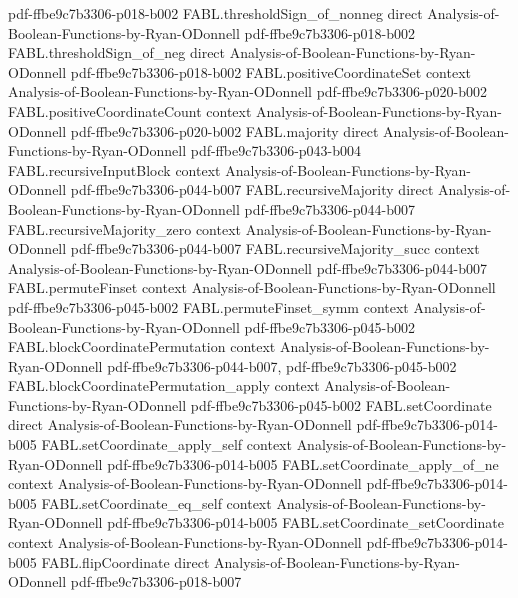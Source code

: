 \begin{theorem}
  {pdf-ffbe9c7b3306-p018-b002}
\proofstep
  {FABL.thresholdSign_of_nonneg}
  {direct}
  {Analysis-of-Boolean-Functions-by-Ryan-ODonnell}
  {pdf-ffbe9c7b3306-p018-b002}
\proofstep
  {FABL.thresholdSign_of_neg}
  {direct}
  {Analysis-of-Boolean-Functions-by-Ryan-ODonnell}
  {pdf-ffbe9c7b3306-p018-b002}
\proofstep
  {FABL.positiveCoordinateSet}
  {context}
  {Analysis-of-Boolean-Functions-by-Ryan-ODonnell}
  {pdf-ffbe9c7b3306-p020-b002}
\proofstep
  {FABL.positiveCoordinateCount}
  {context}
  {Analysis-of-Boolean-Functions-by-Ryan-ODonnell}
  {pdf-ffbe9c7b3306-p020-b002}
\proofstep
  {FABL.majority}
  {direct}
  {Analysis-of-Boolean-Functions-by-Ryan-ODonnell}
  {pdf-ffbe9c7b3306-p043-b004}
\proofstep
  {FABL.recursiveInputBlock}
  {context}
  {Analysis-of-Boolean-Functions-by-Ryan-ODonnell}
  {pdf-ffbe9c7b3306-p044-b007}
\proofstep
  {FABL.recursiveMajority}
  {direct}
  {Analysis-of-Boolean-Functions-by-Ryan-ODonnell}
  {pdf-ffbe9c7b3306-p044-b007}
\proofstep
  {FABL.recursiveMajority_zero}
  {context}
  {Analysis-of-Boolean-Functions-by-Ryan-ODonnell}
  {pdf-ffbe9c7b3306-p044-b007}
\proofstep
  {FABL.recursiveMajority_succ}
  {context}
  {Analysis-of-Boolean-Functions-by-Ryan-ODonnell}
  {pdf-ffbe9c7b3306-p044-b007}
\proofstep
  {FABL.permuteFinset}
  {context}
  {Analysis-of-Boolean-Functions-by-Ryan-ODonnell}
  {pdf-ffbe9c7b3306-p045-b002}
\proofstep
  {FABL.permuteFinset_symm}
  {context}
  {Analysis-of-Boolean-Functions-by-Ryan-ODonnell}
  {pdf-ffbe9c7b3306-p045-b002}
\proofstep
  {FABL.blockCoordinatePermutation}
  {context}
  {Analysis-of-Boolean-Functions-by-Ryan-ODonnell}
  {pdf-ffbe9c7b3306-p044-b007,
    pdf-ffbe9c7b3306-p045-b002}
\proofstep
  {FABL.blockCoordinatePermutation_apply}
  {context}
  {Analysis-of-Boolean-Functions-by-Ryan-ODonnell}
  {pdf-ffbe9c7b3306-p045-b002}
\proofstep
  {FABL.setCoordinate}
  {direct}
  {Analysis-of-Boolean-Functions-by-Ryan-ODonnell}
  {pdf-ffbe9c7b3306-p014-b005}
\proofstep
  {FABL.setCoordinate_apply_self}
  {context}
  {Analysis-of-Boolean-Functions-by-Ryan-ODonnell}
  {pdf-ffbe9c7b3306-p014-b005}
\proofstep
  {FABL.setCoordinate_apply_of_ne}
  {context}
  {Analysis-of-Boolean-Functions-by-Ryan-ODonnell}
  {pdf-ffbe9c7b3306-p014-b005}
\proofstep
  {FABL.setCoordinate_eq_self}
  {context}
  {Analysis-of-Boolean-Functions-by-Ryan-ODonnell}
  {pdf-ffbe9c7b3306-p014-b005}
\proofstep
  {FABL.setCoordinate_setCoordinate}
  {context}
  {Analysis-of-Boolean-Functions-by-Ryan-ODonnell}
  {pdf-ffbe9c7b3306-p014-b005}
\proofstep
  {FABL.flipCoordinate}
  {direct}
  {Analysis-of-Boolean-Functions-by-Ryan-ODonnell}
  {pdf-ffbe9c7b3306-p018-b007}

\end{theorem}
